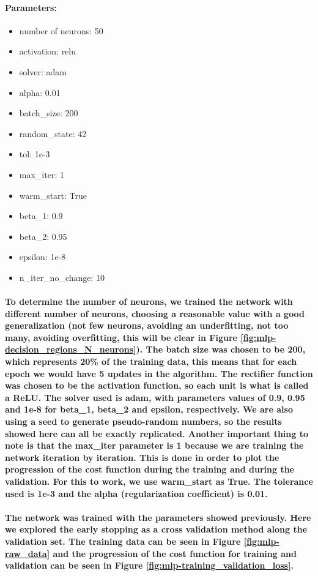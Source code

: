 \documentclass[a4paper]{article}    %
\begin{document}
\paragraph{Parameters:}
\begin{itemize}
    \item number of neurons: 50
    \item activation: relu
    \item solver: adam
    \item alpha: 0.01
    \item batch\_size: 200
    \item random\_state: 42
    \item tol: 1e-3
    \item max\_iter: 1
    \item warm\_start: True
    \item beta\_1: 0.9
    \item beta\_2: 0.95
    \item epsilon: 1e-8
    \item n\_iter\_no\_change: 10
\end{itemize}

\paragraph{To determine the number of neurons, we trained the network with different number of neurons, choosing a reasonable value with a good generalization (not few neurons, avoiding an underfitting, not too many, avoiding overfitting, this will be clear in Figure \ref{fig:mlp-decision_regions_N_neurons}). 
    The batch size was chosen to be 200, which represents 20\% of the training data, this means that for each epoch we would have 5 updates in the algorithm.
    The rectifier function was chosen to be the activation function, so each unit is what is called a ReLU. 
    The solver used is adam, with parameters values of 0.9, 0.95 and 1e-8 for beta\_1, beta\_2 and epsilon, respectively. 
    We are also using a seed to generate pseudo-random numbers, so the results showed here can all be exactly replicated. 
    Another important thing to note is that the max\_iter parameter is 1 because we are training the network iteration by iteration. This is done in order to plot the progression of the cost function during the training and during the validation. For this to work, we use warm\_start as True.    The tolerance used is 1e-3 and the alpha (regularization coefficient) is 0.01.}

\paragraph{The network was trained with the parameters showed previously. Here we explored the early stopping as a cross validation method along the validation set. The training data can be seen in Figure \ref{fig:mlp-raw_data} and the progression of the cost function for training and validation can be seen in Figure \ref{fig:mlp-training_validation_loss}.}
\end{document}
